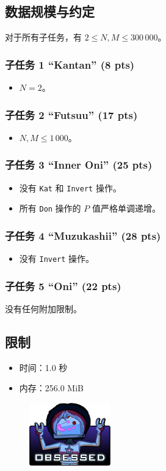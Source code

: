 \documentclass[UTF8, 11pt, a4paper]{article}
\begin{document}
\subsection*{数据规模与约定}
对于所有子任务，有 $2 \leq N, M \leq 300\,000$。
\subsubsection*{子任务 1 “Kantan” (8 pts)}
\begin{itemize}
    \item $N = 2$。
\end{itemize}
\subsubsection*{子任务 2 “Futsuu” (17 pts)}
\begin{itemize}
    \item $N, M \leq 1\,000$。
\end{itemize}
\subsubsection*{子任务 3 “Inner Oni” (25 pts)}
\begin{itemize}
    \item 没有 \texttt{Kat} 和 \texttt{Invert} 操作。
    \item 所有 \texttt{Don} 操作的 $P$ 值严格单调递增。
\end{itemize}
\subsubsection*{子任务 4 “Muzukashii” (28 pts)}
\begin{itemize}
    \item 没有 \texttt{Invert} 操作。
\end{itemize}
\subsubsection*{子任务 5 “Oni” (22 pts)}
    没有任何附加限制。

\subsection*{限制}
\begin{itemize}
\item 时间：1.0 秒
\item 内存：256.0 MiB
\end{itemize}

\begin{figure}[h]\centering
\includegraphics[scale=0.55]{obsessed.png}
\end{figure}
\end{document}
